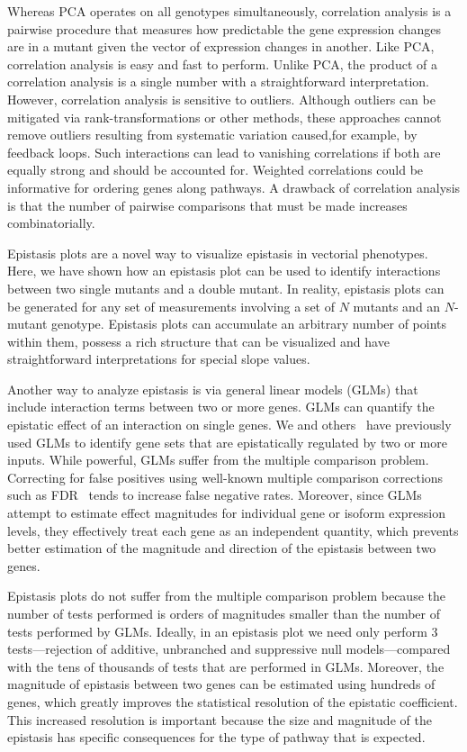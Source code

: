 \documentclass[9pt,twocolumn,twoside,lineno]{pnas-new}
\begin{document}
Whereas PCA operates on all genotypes simultaneously, correlation analysis is a
pairwise procedure that measures how predictable the gene expression changes are
in a mutant given the vector of expression changes in another. Like PCA,
correlation analysis is easy and fast to perform. Unlike PCA, the product of a
correlation analysis is a single number with a straightforward interpretation.
However, correlation analysis is sensitive to outliers. Although outliers can be
mitigated via rank-transformations or other methods, these approaches cannot
remove outliers resulting from systematic variation caused,for example, by
feedback loops. Such interactions can lead to vanishing correlations if both are
equally strong and should be accounted for. Weighted correlations could be
informative for ordering genes along pathways. A drawback of correlation
analysis is that the number of pairwise comparisons that must be made increases
combinatorially.

Epistasis plots are a novel way to visualize epistasis in vectorial phenotypes.
Here, we have shown how an epistasis plot can be used to identify interactions
between two single mutants and a double mutant. In reality, epistasis plots
can be generated for any set of measurements involving a set of $N$ mutants and
an $N$-mutant genotype. Epistasis plots can accumulate an arbitrary number of
points within them, possess a rich structure that can be visualized and have
straightforward interpretations for special slope values.

Another way to analyze epistasis is via general linear models (GLMs) that include
interaction terms between two or more genes. GLMs can quantify the epistatic
effect of an interaction on single genes. We and others~\cite{Dixit2016,
Angeles-Albores2016a} have previously used GLMs to identify gene sets that are
epistatically regulated by two or more inputs. While powerful, GLMs suffer from
the multiple comparison problem. Correcting for false positives using well-known
multiple comparison corrections such as FDR~\cite{Storey2003} tends to increase
false negative rates.  Moreover, since GLMs attempt to estimate effect magnitudes
for individual gene or isoform expression levels, they effectively treat each gene
as an independent quantity, which prevents better estimation of the magnitude and
direction of the epistasis between two genes.

Epistasis plots do not suffer from the multiple comparison problem because the
number of tests performed is orders of magnitudes smaller than the number
of tests performed by GLMs. Ideally, in an epistasis plot we need only perform
3 tests---rejection of additive, unbranched and suppressive null models---compared
with the tens of thousands of tests that are performed in GLMs. Moreover, the
magnitude of epistasis between two genes can be estimated using hundreds of genes,
which greatly improves the statistical resolution of the epistatic coefficient.
This increased resolution is important because the size and magnitude of the
epistasis has specific consequences for the type of pathway that is expected.
\end{document}
